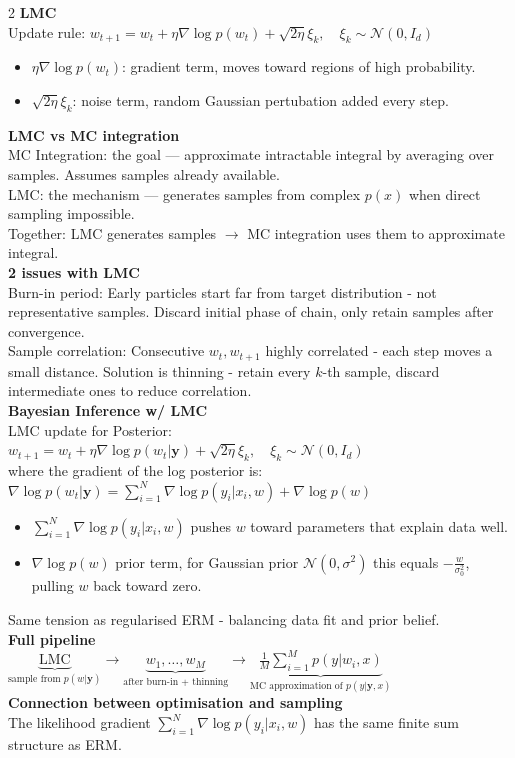 \documentclass[10pt]{article}
\begin{document}
\begin{multicols*}{2}
\textbf{LMC}\\
Update rule:
$w_{t+1} = w_t + \eta\nabla\log p(w_t) + \sqrt{2\eta}\xi_k, \quad \xi_k \sim \mathcal{N}(0, I_d)$\\
\begin{itemize}
    \item $\eta\nabla\log p(w_t)$: gradient term, moves toward regions of high probability.
    \item $\sqrt{2\eta}\xi_k$: noise term, random Gaussian pertubation added every step.
\end{itemize}
\textbf{LMC vs MC integration}\\
MC Integration: the goal — approximate intractable integral by averaging over samples. Assumes samples already available.\\
LMC: the mechanism — generates samples from complex $p(x)$ when direct sampling impossible.\\
Together: LMC generates samples $\to$ MC integration uses them to approximate integral.\\
\textbf{2 issues with LMC}\\
Burn-in period: Early particles start far from target distribution - not representative samples.
Discard initial phase of chain, only retain samples after convergence.\\
Sample correlation: Consecutive $w_t, w_{t+1}$ highly correlated - each step moves a small distance.
Solution is thinning - retain every $k$-th sample, discard intermediate ones to reduce correlation.\\
\textbf{Bayesian Inference w/ LMC}\\
LMC update for Posterior:\\
$w_{t+1} = w_t + \eta\nabla\log p(w_t|\mathbf{y}) + \sqrt{2\eta}\xi_k, \quad \xi_k \sim \mathcal{N}(0, I_d)$\\
where the gradient of the log posterior is:\\
$\nabla\log p(w_t|\mathbf{y}) = \sum_{i=1}^{N}\nabla\log p(y_i|x_i, w) + \nabla\log p(w)$\\
\begin{itemize}
    \item $\sum_{i=1}^{N}\nabla\log p(y_i|x_i, w)$ pushes $w$ toward parameters that explain data well.
    \item $\nabla\log p(w)$ prior term, for Gaussian prior $\mathcal{N}(0,\sigma^2)$ this equals $-\frac{w}{\sigma_0^2}$, pulling $w$ back toward zero.
\end{itemize}
Same tension as regularised ERM - balancing data fit and prior belief.\\
\textbf{Full pipeline}\\
$\underbrace{\text{LMC}}_{\text{sample from } p(w|\mathbf{y})} \rightarrow \underbrace{w_1, \dots, w_M}_{\text{after burn-in + thinning}} \rightarrow \underbrace{\frac{1}{M}\sum_{i=1}^{M}p(y|w_i, x)}_{\text{MC approximation of } p(y|\mathbf{y},x)}$\\
\textbf{Connection between optimisation and sampling}\\
The likelihood gradient $\sum_{i=1}^{N}\nabla\log p(y_i|x_i, w)$ has the same finite sum structure as ERM.\\[0.5\baselineskip]


\end{multicols*}
\end{document}
